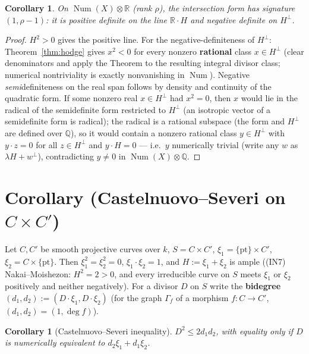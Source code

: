 \documentclass[11pt]{article}
\newtheorem{corollary}[theorem]{Corollary}
\theoremstyle{definition}
\theoremstyle{remark}
\newcommand{\Num}{\operatorname{Num}}
\begin{document}
\begin{corollary}
\label{cor:signature}
On $\Num(X) \otimes \mathbb{R}$ (rank $\rho$), the intersection form has signature
$(1, \rho - 1)$: it is positive definite on the line $\mathbb{R} \cdot H$ and negative
definite on $H^{\perp}$.
\end{corollary}

\begin{proof}
$H^2 > 0$ gives the positive line. For the negative-definiteness of $H^{\perp}$:
Theorem~\ref{thm:hodge} gives $x^2 < 0$ for every nonzero \textbf{rational} class
$x \in H^{\perp}$ (clear denominators and apply the Theorem to the resulting integral
divisor class; numerical nontriviality is exactly nonvanishing in $\Num$). Negative
\emph{semi}definiteness on the real span follows by density and continuity of the quadratic
form. If some nonzero real $x \in H^{\perp}$ had $x^2 = 0$, then $x$ would lie in the
radical of the semidefinite form restricted to $H^{\perp}$ (an isotropic vector of a
semidefinite form is radical); the radical is a rational subspace (the form and $H^{\perp}$
are defined over $\mathbb{Q}$), so it would contain a nonzero rational class
$y \in H^{\perp}$ with $y \cdot z = 0$ for all $z \in H^{\perp}$ and $y \cdot H = 0$ ---
i.e.\ $y$ numerically trivial (write any $w$ as $\lambda H + w^{\perp}$), contradicting
$y \ne 0$ in $\Num(X) \otimes \mathbb{Q}$.
\end{proof}

\section{Corollary (Castelnuovo--Severi on \texorpdfstring{$C \times C'$}{C x C'})}
\label{sec:cs}

Let $C, C'$ be smooth projective curves over $k$, $S = C \times C'$,
$\xi_1 = \{\mathrm{pt}\} \times C'$, $\xi_2 = C \times \{\mathrm{pt}\}$. Then
$\xi_1^2 = \xi_2^2 = 0$, $\xi_1 \cdot \xi_2 = 1$, and $H := \xi_1 + \xi_2$ is ample ((IN7)
Nakai--Moishezon: $H^2 = 2 > 0$, and every irreducible curve on $S$ meets $\xi_1$ or
$\xi_2$ positively and neither negatively). For a divisor $D$ on $S$ write the
\textbf{bidegree} $(d_1, d_2) := (D \cdot \xi_1, D \cdot \xi_2)$ (for the graph $\Gamma_f$
of a morphism $f\colon C \to C'$, $(d_1, d_2) = (1, \deg f)$).

\begin{corollary}[Castelnuovo--Severi inequality]
\label{cor:cs}
$D^2 \le 2 d_1 d_2$, with equality only if $D$ is numerically equivalent to
$d_2 \xi_1 + d_1 \xi_2$.
\end{corollary}
\end{document}
